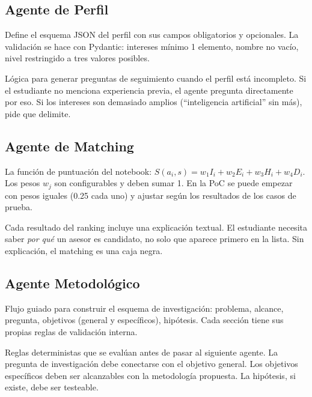 \documentclass[12pt, a4paper]{article}
\begin{document}
\subsection{Agente de Perfil}

\begin{description}[style=nextline, leftmargin=3cm]
    \item[\texttt{perfil/estructura}]
    Define el esquema JSON del perfil con sus campos obligatorios y
    opcionales. La validación se hace con Pydantic: intereses mínimo 1
    elemento, nombre no vacío, nivel restringido a tres valores posibles.

    \item[\texttt{perfil/preguntas-adaptativas}]
    Lógica para generar preguntas de seguimiento cuando el perfil está
    incompleto. Si el estudiante no menciona experiencia previa, el
    agente pregunta directamente por eso. Si los intereses son demasiado
    amplios (``inteligencia artificial'' sin más), pide que delimite.
\end{description}

\subsection{Agente de Matching}

\begin{description}[style=nextline, leftmargin=3cm]
    \item[\texttt{matching/scoring}]
    La función de puntuación del notebook: $S(a_i, s) = w_1 I_i + w_2
    E_i + w_3 H_i + w_4 D_i$. Los pesos $w_j$ son configurables y deben
    sumar 1. En la PoC se puede empezar con pesos iguales (0.25 cada uno)
    y ajustar según los resultados de los casos de prueba.

    \item[\texttt{matching/explainability}]
    Cada resultado del ranking incluye una explicación textual. El
    estudiante necesita saber \emph{por qué} un asesor es candidato, no
    solo que aparece primero en la lista. Sin explicación, el matching es
    una caja negra.
\end{description}

\subsection{Agente Metodológico}

\begin{description}[style=nextline, leftmargin=3cm]
    \item[\texttt{metodologico/delimitacion}]
    Flujo guiado para construir el esquema de investigación: problema,
    alcance, pregunta, objetivos (general y específicos), hipótesis.
    Cada sección tiene sus propias reglas de validación interna.

    \item[\texttt{metodologico/coherencia-interna}]
    Reglas deterministas que se evalúan antes de pasar al siguiente
    agente. La pregunta de investigación debe conectarse con el objetivo
    general. Los objetivos específicos deben ser alcanzables con la
    metodología propuesta. La hipótesis, si existe, debe ser testeable.
\end{description}
\end{document}
